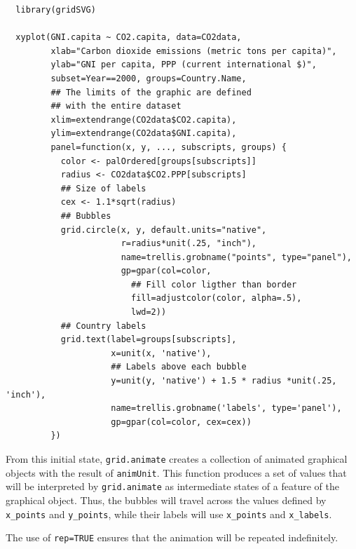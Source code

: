 \documentclass[smallroyalvopaper]{memoir}
\begin{document}
\lstset{language=r,label= ,caption= ,captionpos=b,numbers=none}
\begin{lstlisting}
  library(gridSVG)
  
  xyplot(GNI.capita ~ CO2.capita, data=CO2data,
         xlab="Carbon dioxide emissions (metric tons per capita)",
         ylab="GNI per capita, PPP (current international $)",
         subset=Year==2000, groups=Country.Name,
         ## The limits of the graphic are defined
         ## with the entire dataset
         xlim=extendrange(CO2data$CO2.capita),
         ylim=extendrange(CO2data$GNI.capita),
         panel=function(x, y, ..., subscripts, groups) {
           color <- palOrdered[groups[subscripts]]
           radius <- CO2data$CO2.PPP[subscripts]
           ## Size of labels
           cex <- 1.1*sqrt(radius)
           ## Bubbles
           grid.circle(x, y, default.units="native",
                       r=radius*unit(.25, "inch"),
                       name=trellis.grobname("points", type="panel"),
                       gp=gpar(col=color,
                         ## Fill color ligther than border
                         fill=adjustcolor(color, alpha=.5),
                         lwd=2))
           ## Country labels
           grid.text(label=groups[subscripts],
                     x=unit(x, 'native'),
                     ## Labels above each bubble
                     y=unit(y, 'native') + 1.5 * radius *unit(.25, 'inch'),
                     name=trellis.grobname('labels', type='panel'),
                     gp=gpar(col=color, cex=cex))
         })
\end{lstlisting}

From this initial state, \texttt{grid.animate} creates a collection of
animated graphical objects with the result of \texttt{animUnit}. This
function produces a set of values that will be interpreted by
\texttt{grid.animate} as intermediate states of a feature of the graphical
object. Thus, the bubbles will travel across the values defined by
\texttt{x\_points} and \texttt{y\_points}, while their labels will use \texttt{x\_points} and
\texttt{x\_labels}.

The use of \texttt{rep=TRUE} ensures that the animation will be repeated
indefinitely.

\end{document}
